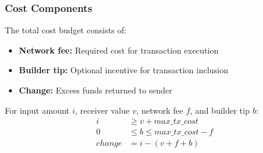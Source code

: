 \subsubsection{Cost Components}
The total cost budget consists of:
\begin{itemize}
    \item \textbf{Network fee:} Required cost for transaction execution
    \item \textbf{Builder tip:} Optional incentive for transaction inclusion
    \item \textbf{Change:} Excess funds returned to sender
\end{itemize}

For input amount $i$, receiver value $v$, network fee $f$, and builder tip $b$:
\begin{align*}
i &\geq v + max\_tx\_cost \\
0 &\leq b \leq max\_tx\_cost - f \\
change &= i - (v + f + b)
\end{align*}

